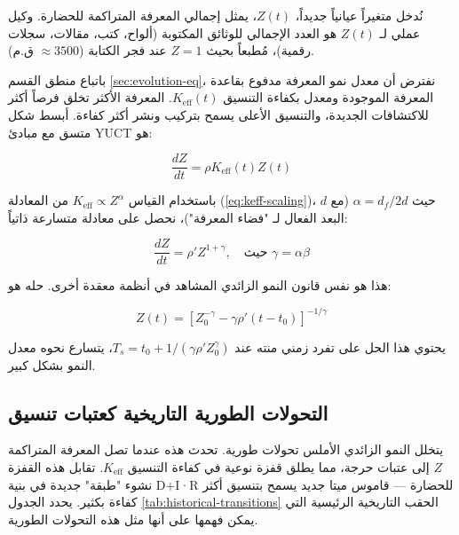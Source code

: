 \documentclass[11pt,a4paper]{article}
\newcommand{\df}{d_{\!f}}
\begin{document}
	نُدخل متغيراً عيانياً جديداً، \(Z(t)\)، يمثل إجمالي المعرفة المتراكمة للحضارة. وكيل عملي لـ \(Z(t)\) هو العدد الإجمالي للوثائق المكتوبة (ألواح، كتب، مقالات، سجلات رقمية)، مُطبعاً بحيث \(Z=1\) عند فجر الكتابة (\(\approx 3500\) ق.م).
	
	باتباع منطق القسم \ref{sec:evolution-eq}، نفترض أن معدل نمو المعرفة مدفوع بقاعدة المعرفة الموجودة ومعدل بكفاءة التنسيق \(K_{\text{eff}}(t)\). المعرفة الأكثر تخلق فرصاً أكثر للاكتشافات الجديدة، والتنسيق الأعلى يسمح بتركيب ونشر أكثر كفاءة. أبسط شكل متسق مع مبادئ YUCT هو:
	
	\begin{equation}
		\frac{dZ}{dt} = \rho K_{\text{eff}}(t) Z(t)
		\label{eq:Z-growth}
	\end{equation}
	
	باستخدام القياس \(K_{\text{eff}} \propto Z^{\alpha}\) من المعادلة (\ref{eq:keff-scaling})، حيث \(\alpha = \df/2d\) (مع \(d\) البعد الفعال لـ "فضاء المعرفة")، نحصل على معادلة متسارعة ذاتياً:
	
	\begin{equation}
		\frac{dZ}{dt} = \rho' Z^{1+\gamma}, \quad \text{حيث } \gamma = \alpha \beta
		\label{eq:Z-self-accel}
	\end{equation}
	
	هذا هو نفس قانون النمو الزائدي المشاهد في أنظمة معقدة أخرى. حله هو:
	
	\begin{equation}
		Z(t) = \left[ Z_0^{-\gamma} - \gamma \rho' (t - t_0) \right]^{-1/\gamma}
		\label{eq:Z-hyperbolic}
	\end{equation}
	
	يحتوي هذا الحل على تفرد زمني منته عند \(T_s = t_0 + 1/(\gamma \rho' Z_0^{\gamma})\)، يتسارع نحوه معدل النمو بشكل كبير.
	
	\subsection{التحولات الطورية التاريخية كعتبات تنسيق}
	
	يتخلل النمو الزائدي الأملس تحولات طورية. تحدث هذه عندما تصل المعرفة المتراكمة \(Z\) إلى عتبات حرجة، مما يطلق قفزة نوعية في كفاءة التنسيق \(K_{\text{eff}}\). تقابل هذه القفزة نشوء "طبقة" جديدة في بنية D+I·R للحضارة — قاموس ميتا جديد يسمح بتنسيق أكثر كفاءة بكثير. يحدد الجدول \ref{tab:historical-transitions} الحقب التاريخية الرئيسية التي يمكن فهمها على أنها مثل هذه التحولات الطورية.
	
\end{document}
